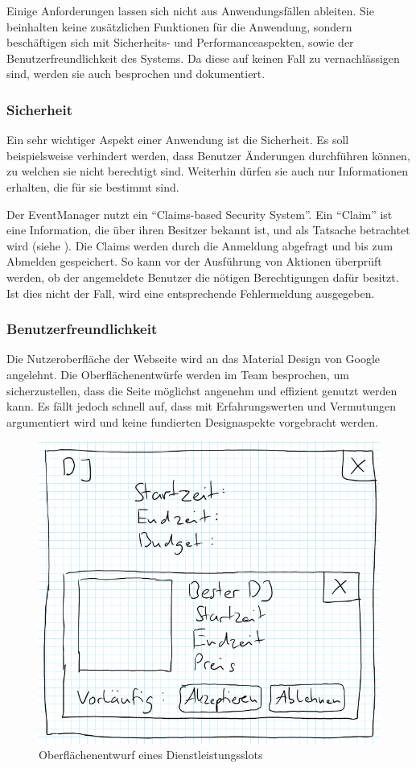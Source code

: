 

Einige Anforderungen lassen sich nicht aus Anwendungsfällen ableiten. Sie beinhalten keine zusätzlichen Funktionen für die Anwendung, sondern beschäftigen sich mit Sicherheits- und Performanceaspekten, sowie der Benutzerfreundlichkeit des Systems. Da diese auf keinen Fall zu vernachlässigen sind, werden sie auch besprochen und dokumentiert.

\subsubsection{Sicherheit}

Ein sehr wichtiger Aspekt einer Anwendung ist die Sicherheit. Es soll beispielsweise verhindert werden, dass Benutzer Änderungen durchführen können, zu welchen sie nicht berechtigt sind. Weiterhin dürfen sie auch nur Informationen erhalten, die für sie bestimmt sind.

Der EventManager nutzt ein \enquote{Claims-based Security System}. Ein \enquote{Claim} ist eine Information, die über ihren Besitzer bekannt ist, und als Tatsache betrachtet wird (siehe ). Die Claims werden durch die Anmeldung abgefragt und bis zum Abmelden gespeichert. So kann vor der Ausführung von Aktionen überprüft werden, ob der angemeldete Benutzer die nötigen Berechtigungen dafür besitzt. Ist dies nicht der Fall, wird eine entsprechende Fehlermeldung ausgegeben.

\subsubsection{Benutzerfreundlichkeit}

Die Nutzeroberfläche der Webseite wird an das Material Design von Google angelehnt. Die Oberflächenentwürfe werden im Team besprochen, um sicherzustellen, dass die Seite möglichst angenehm und effizient genutzt werden kann. Es fällt jedoch schnell auf, dass mit Erfahrungswerten und Vermutungen argumentiert wird und keine fundierten Designaspekte vorgebracht werden.

\begin{figure}[h]
\centering
\includegraphics[width=.5\textwidth]{res/images/ServiceSlot.png}
\caption{Oberflächenentwurf eines Dienstleistungsslots}
\label{ss}
\end{figure}

